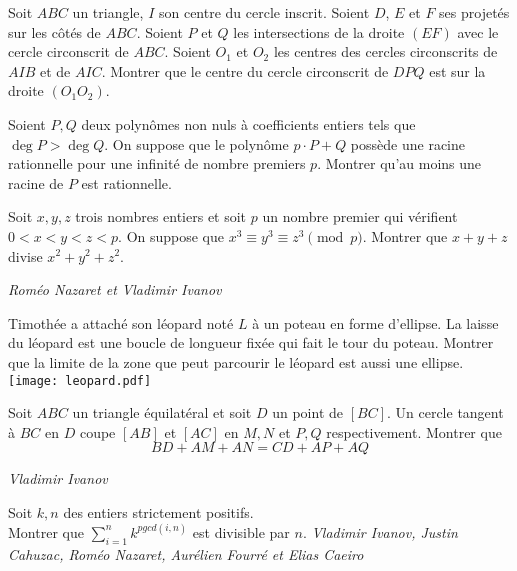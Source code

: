 \begin{exo}{}
Soit $ABC$ un triangle, $I$ son centre du cercle inscrit. Soient $D$, $E$ et $F$ ses projetés sur les côtés de $ABC$. Soient $P$ et $Q$ les intersections de la droite $(EF)$ avec le cercle circonscrit de $ABC$. Soient $O_1$ et $O_2$ les centres des cercles circonscrits de $AIB$ et de $AIC$. Montrer que le centre du cercle circonscrit de $DPQ$ est sur la droite $(O_1O_2)$.
\end{exo}

\begin{exo}{}
Soient $P,Q$ deux polynômes non nuls à coefficients entiers tels que $ \deg P>\deg Q$. On suppose que le polynôme $p \cdot P+Q$ possède une racine rationnelle pour une infinité de nombre premiers $p$. Montrer qu'au moins une racine de $P$ est rationnelle.
\end{exo}



\begin{exo}{}
Soit $x,y,z$ trois nombres entiers et soit $p$ un nombre premier qui vérifient $0<x<y<z<p$. On suppose que $x^3\equiv y^3\equiv z^3\pmod p$. Montrer que $x+y+z$ divise $x^2+y^2+z^2$.

\medskip
\textit{Roméo Nazaret et Vladimir Ivanov}
\end{exo}


\begin{exo}{}
 Timothée a attaché son léopard noté $L$ à un poteau en forme d'ellipse. La laisse du léopard est une boucle de longueur fixée qui fait le tour du poteau. Montrer que la limite de la zone que peut parcourir le léopard est aussi une ellipse. \\
\texttt{[image: leopard.pdf]}\end{exo}





\begin{exo}{}
Soit  $ABC$ un triangle équilatéral et soit $D$ un point de $[BC]$. Un cercle tangent à $BC$ en $D$ coupe $[AB]$ et $[AC]$ en $M,N$ et $P,Q$ respectivement. Montrer que
$$BD+AM+AN=CD+AP+AQ$$

\medskip
\textit{Vladimir Ivanov}
\end{exo}

\begin{exo}{}
Soit $k, n$ des entiers strictement positifs. \\
Montrer que $\sum\limits_{i=1}^n k^{pgcd(i,n)}$ est divisible par $n$.
\medskip
\textit{Vladimir Ivanov, Justin Cahuzac, Roméo Nazaret, Aurélien Fourré et Elias Caeiro}
\end{exo}



